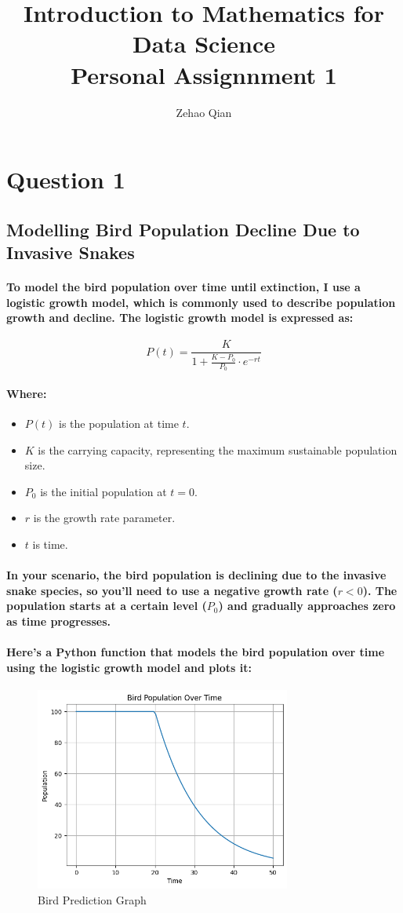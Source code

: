 \documentclass[11pt]{article} %
\title{Introduction to Mathematics for Data Science \\ Personal Assignnment 1}
\author{Zehao Qian}
\begin{document}
\maketitle
% 
% 
% 
\section{Question 1}
\subsection{Modelling Bird Population Decline Due to Invasive Snakes}
% 
\paragraph{To model the bird population over time until extinction, I use a logistic growth model, which is commonly used to describe population growth and decline. The logistic growth model is expressed as:}
% 
\[P(t) = \frac{K}{1 + \frac{K - P_0}{P_0} \cdot e^{-rt}}\]
% 
\paragraph{Where:}
\begin{itemize}
    \item \(P(t)\) is the population at time \(t\).
    \item \(K\) is the carrying capacity, representing the maximum sustainable population size.
    \item \(P_0\) is the initial population at \(t = 0\).
    \item \(r\) is the growth rate parameter.
    \item \(t\) is time.
\end{itemize}
% 
% 
\paragraph{In your scenario, the bird population is declining due to the invasive snake species, so you'll need to use a negative growth rate (\(r < 0\)). The population starts at a certain level (\(P_0\)) and gradually approaches zero as time progresses.}

\paragraph{Here's a Python function that models the bird population over time using the logistic growth model and plots it:}
% 
% 
\begin{figure}[H]
    \centering
    \includegraphics[width=0.75\textwidth]{pic/BirdPopullationModel.png}
    \caption{Bird Prediction Graph}
\end{figure}
% 
% 
\end{document}
